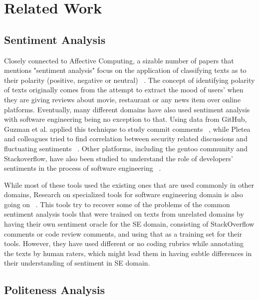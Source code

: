 \section{Related Work}
\subsection{Sentiment Analysis}\label{rwsent}
Closely connected to Affective Computing, a sizable number of papers that mentions "sentiment analysis" focus on the application of classifying texts as to their polarity (positive, negative or neutral) ~\cite{pang2008opinion}. The concept of identifying polarity of texts originally comes from the attempt to extract the mood of users' when they are giving reviews about movie, restaurant or any news item over online platforms. Eventually, many different domains have also used sentiment analysis with software engineering being no exception to that. Using data from GitHub, Guzman et al. applied this technique to study commit comments ~\cite{guzman2014sentiment}, while Pletea and colleagues tried to find correlation between security related discussions and fluctuating sentiments ~\cite{pletea2014security}. Other platforms, including the gentoo community and Stackoverflow, have also been studied to understand the role of developers’ sentiments in the process of software engineering ~\cite{garcia2013role,islam2016towards,guzman2013towards,novielli2014towards}.

While most of these tools used the existing ones that are used commonly in other domains, Research on specialized tools for software engineering domain is also going on ~\cite{jongeling2017negative,ahmed2017senticr}. This tools try to recover some of the problems of the common sentiment analysis tools that were trained on texts from unrelated domains by having their own sentiment oracle for the SE domain, consisting of StackOverflow comments or code review comments, and using that as a training set for their tools. However, they have used different or no coding rubrics while annotating the texts by human raters, which might lead them in having subtle differences in their understanding of sentiment in SE domain.

\subsection{Politeness Analysis}

